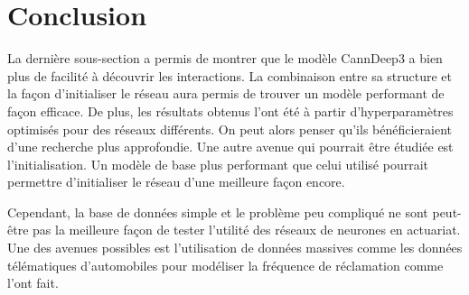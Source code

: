 \chapter*{Conclusion}           %
\label{chap:conclusion}         %

La dernière sous-section a permis de montrer que le modèle CannDeep3 a bien plus de facilité à découvrir les interactions. La combinaison entre sa structure et la façon d'initialiser le réseau aura permis de trouver un modèle performant de façon efficace. De plus, les résultats obtenus l'ont été à partir d'hyperparamètres optimisés pour des réseaux différents. On peut alors penser qu'ils bénéficieraient d'une recherche plus approfondie. Une autre avenue qui pourrait être étudiée est l'initialisation. Un modèle de base plus performant que celui utilisé pourrait permettre d'initialiser le réseau d'une meilleure façon encore. 

Cependant, la base de données simple et le problème peu compliqué ne sont peut-être pas la meilleure façon de tester l'utilité des réseaux de neurones en actuariat. Une des avenues possibles est l'utilisation de données massives comme les données télématiques d'automobiles pour modéliser la fréquence de réclamation comme \citet{gao2019claims} l'ont fait.
